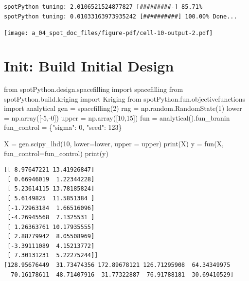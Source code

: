 \documentclass[
  letterpaper,
  DIV=11,
  numbers=noendperiod]{scrreprt}
\newenvironment{Shaded}{\begin{snugshade}}{\end{snugshade}}
\newcommand{\BuiltInTok}[1]{\textcolor[rgb]{0.00,0.23,0.31}{#1}}
\newcommand{\DecValTok}[1]{\textcolor[rgb]{0.68,0.00,0.00}{#1}}
\newcommand{\ImportTok}[1]{\textcolor[rgb]{0.00,0.46,0.62}{#1}}
\newcommand{\NormalTok}[1]{\textcolor[rgb]{0.00,0.23,0.31}{#1}}
\newcommand{\OperatorTok}[1]{\textcolor[rgb]{0.37,0.37,0.37}{#1}}
\newcommand{\StringTok}[1]{\textcolor[rgb]{0.13,0.47,0.30}{#1}}
\begin{document}
\begin{verbatim}
spotPython tuning: 2.0106521524877827 [#########-] 85.71% 
spotPython tuning: 0.01033163973935242 [##########] 100.00% Done...
\end{verbatim}

\texttt{[image: a\_04\_spot\_doc\_files/figure-pdf/cell-10-output-2.pdf]}

\section{Init: Build Initial Design}\label{init-build-initial-design-1}

\begin{Shaded}
\begin{Highlighting}[]
\ImportTok{from}\NormalTok{ spotPython.design.spacefilling }\ImportTok{import}\NormalTok{ spacefilling}
\ImportTok{from}\NormalTok{ spotPython.build.kriging }\ImportTok{import}\NormalTok{ Kriging}
\ImportTok{from}\NormalTok{ spotPython.fun.objectivefunctions }\ImportTok{import}\NormalTok{ analytical}
\NormalTok{gen }\OperatorTok{=}\NormalTok{ spacefilling(}\DecValTok{2}\NormalTok{)}
\NormalTok{rng }\OperatorTok{=}\NormalTok{ np.random.RandomState(}\DecValTok{1}\NormalTok{)}
\NormalTok{lower }\OperatorTok{=}\NormalTok{ np.array([}\OperatorTok{{-}}\DecValTok{5}\NormalTok{,}\OperatorTok{{-}}\DecValTok{0}\NormalTok{])}
\NormalTok{upper }\OperatorTok{=}\NormalTok{ np.array([}\DecValTok{10}\NormalTok{,}\DecValTok{15}\NormalTok{])}
\NormalTok{fun }\OperatorTok{=}\NormalTok{ analytical().fun\_branin}
\NormalTok{fun\_control }\OperatorTok{=}\NormalTok{ \{}\StringTok{"sigma"}\NormalTok{: }\DecValTok{0}\NormalTok{,}
               \StringTok{"seed"}\NormalTok{: }\DecValTok{123}\NormalTok{\}}

\NormalTok{X }\OperatorTok{=}\NormalTok{ gen.scipy\_lhd(}\DecValTok{10}\NormalTok{, lower}\OperatorTok{=}\NormalTok{lower, upper }\OperatorTok{=}\NormalTok{ upper)}
\BuiltInTok{print}\NormalTok{(X)}
\NormalTok{y }\OperatorTok{=}\NormalTok{ fun(X, fun\_control}\OperatorTok{=}\NormalTok{fun\_control)}
\BuiltInTok{print}\NormalTok{(y)}
\end{Highlighting}
\end{Shaded}

\begin{verbatim}
[[ 8.97647221 13.41926847]
 [ 0.66946019  1.22344228]
 [ 5.23614115 13.78185824]
 [ 5.6149825  11.5851384 ]
 [-1.72963184  1.66516096]
 [-4.26945568  7.1325531 ]
 [ 1.26363761 10.17935555]
 [ 2.88779942  8.05508969]
 [-3.39111089  4.15213772]
 [ 7.30131231  5.22275244]]
[128.95676449  31.73474356 172.89678121 126.71295908  64.34349975
  70.16178611  48.71407916  31.77322887  76.91788181  30.69410529]
\end{verbatim}
\end{document}
